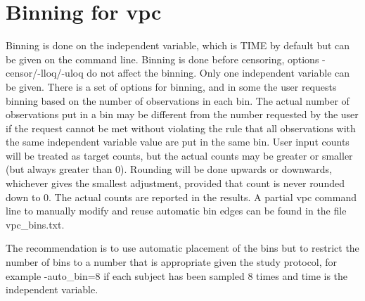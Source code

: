 \section{Binning for vpc}
Binning is done on the independent variable, which is TIME by default but can be given on the command line. Binning is done before censoring, options -censor/-lloq/-uloq do not affect the binning. Only one independent variable can be given. There is a set of options for binning, and in some the user requests binning based on the number of observations in each bin. The actual number of observations put in a bin may be different from the number requested by the user if the request cannot be met without violating the rule that all observations with the same independent variable value are put in the same bin. User input counts will be treated as target counts, but the actual counts may be greater or smaller (but always greater than 0). Rounding will be done upwards or downwards, whichever gives the smallest adjustment, provided that count is never rounded down to 0. The actual counts are reported in the results. A partial vpc command line to manually modify and reuse automatic bin edges can be found in the file vpc\_bins.txt.

The recommendation is to use automatic placement of the bins but to restrict the number of bins to a number that is appropriate given the study protocol, for example -auto\_bin=8 if each subject has been sampled 8 times and time is the independent variable.

